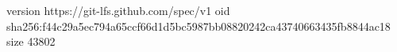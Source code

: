 version https://git-lfs.github.com/spec/v1
oid sha256:f44c29a5ec794a65ccf66d1d5bc5987bb08820242ca43740663435fb8844ac18
size 43802
